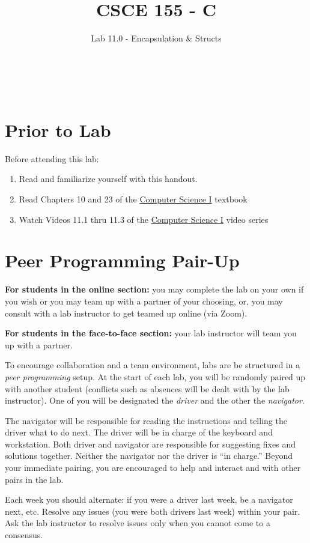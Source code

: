 \documentclass[12pt]{scrartcl}
\title{CSCE 155 - C}
\subtitle{Lab 11.0 - Encapsulation \& Structs}
\author{~}
\date{~}
\begin{document}
\maketitle

\section*{Prior to Lab}

Before attending this lab:
\begin{enumerate}
  \item Read and familiarize yourself with this handout.
  \item Read Chapters 10 and 23 of the \href{http://cse.unl.edu/~cbourke/ComputerScienceOne.pdf}{Computer Science I} textbook
  \item Watch Videos 11.1 thru 11.3 of the \href{https://www.youtube.com/playlist?list=PL4IH6CVPpTZVkiEnCEOdGbYsFEdtKc5Bx}{Computer Science I} video series
\end{enumerate}

\section*{Peer Programming Pair-Up}

\textbf{For students in the online section:} you may complete
the lab on your own if you wish or you may team up with a partner
of your choosing, or, you may consult with a lab instructor to get
teamed up online (via Zoom).

\textbf{For students in the face-to-face section:} your
lab instructor will team you up with a partner.  

To encourage collaboration and a team environment, labs are be
structured in a \emph{peer programming} setup.  At the start of
each lab, you will be randomly paired up with another student 
(conflicts such as absences will be dealt with by the lab instructor).
One of you will be designated the \emph{driver} and the other
the \emph{navigator}.  

The navigator will be responsible for reading the instructions and
telling the driver what to do next.  The driver will be in charge of the
keyboard and workstation.  Both driver and navigator are responsible
for suggesting fixes and solutions together.  Neither the navigator
nor the driver is ``in charge.''  Beyond your immediate pairing, you
are encouraged to help and interact and with other pairs in the lab.

Each week you should alternate: if you were a driver last week, 
be a navigator next, etc.  Resolve any issues (you were both drivers
last week) within your pair.  Ask the lab instructor to resolve issues
only when you cannot come to a consensus.  
\end{document}
